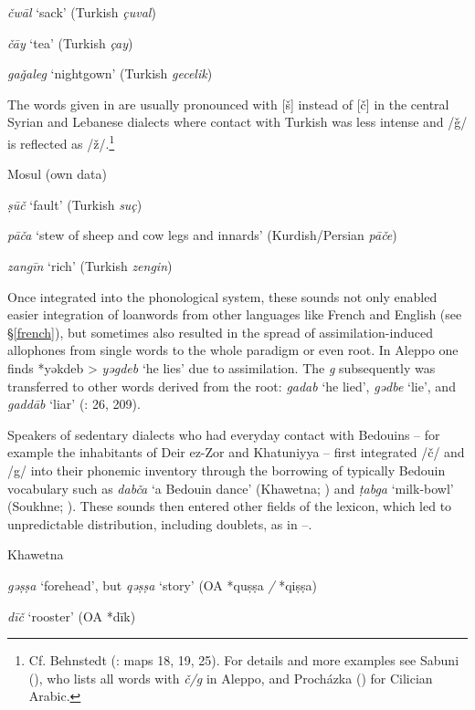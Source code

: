 \documentclass[output=paper]{langsci/langscibook}
\begin{document}
\textit{čwāl} ‘sack’ (Turkish \textit{çuval})

\textit{čāy} ‘tea’ (Turkish \textit{çay})

\textit{gaǧaleg} ‘nightgown’ (Turkish \textit{gecelik})
\z

The words given in  are usually pronounced with [š] instead of [č] in the central Syrian and Lebanese dialects where contact with Turkish was less intense and /ǧ/ is reflected as /ž/.\footnote{Cf. Behnstedt (\citeyear{Behnstedt1997}: maps 18, 19, 25). For details and more examples see Sabuni (\citeyear[205--210]{Sabuni1980}), who lists all words with \textit{č/g} in Aleppo, and Procházka (\citeyear[185]{Procházka2002Adana}) for Cilician Arabic.}

\ea\label{Mosul}
Mosul (own data)

\textit{ṣūč} ‘fault’ (Turkish \textit{suç})

\textit{pāča} ‘stew of sheep and cow legs and innards’ (Kurdish/Persian \textit{pāče})

\textit{zangīn} ‘rich’ (Turkish \textit{zengin})
\z

Once integrated into the phonological system, these sounds not only enabled easier integration of loanwords from other languages like French and English (see §\ref{french}), but sometimes also resulted in the spread of assimilation-induced allophones from single words to the whole paradigm or even root. In Aleppo one finds *yəkdeb > \textit{yəgdeb} ‘he lies’ due to assimilation. The \textit{g} subsequently was transferred to other words derived from the root: \textit{gadab} ‘he lied’, \textit{gədbe} ‘lie’, and \textit{gaddāb} ‘liar’ (\citealt{Sabuni1980}: 26, 209). 

Speakers of sedentary dialects who had everyday contact with Bedouins – for example the inhabitants of Deir ez-Zor and Khatuniyya – first integrated /č/ and /g/ into their phonemic inventory through the borrowing of typically Bedouin vocabulary such as \textit{dabča} ‘a Bedouin dance’ (Khawetna; \citealt[29]{Talay1999}) and \textit{ṭabga} ‘milk-bowl’ (Soukhne; \citealt[310]{Behnstedt1994Soukhne}). These sounds then entered other fields of the lexicon, which led to unpredictable distribution, including doublets, as in --.

\ea\label{Khawetna} Khawetna \citep[28--31]{Talay1999}  

\textit{gəṣṣa} ‘forehead’, but \textit{qəṣṣa} ‘story’ (OA *quṣṣa \textit{/} *qiṣṣa)

\textit{dīč} ‘rooster’  (OA *dīk)
\z
\end{document}
